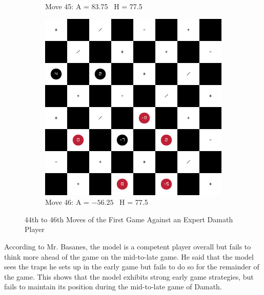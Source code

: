 \begin{figure}[H]
\begin{subfigure}{0.3\textwidth}
        \caption*{Move 45: A = 83.75 \textbar\ H = 77.5}
    \end{subfigure}
    \quad
    \begin{subfigure}{0.3\textwidth}
        \centering
        \includegraphics[width=\textwidth]{images/games/game1/move_47.png}
        \caption*{Move 46: A = $-56.25$ \textbar\ H = 77.5}
    \end{subfigure}
    \caption{44th to 46th Moves of the First Game Against an Expert Damath Player}
    \label{fig:44-46-game1}
\end{figure}

According to Mr. Basanes, the model is a competent player overall but fails to think more ahead of the game on the mid-to-late game. He said that the model sees the traps he sets up in the early game but fails to do so for the remainder of the game. This shows that the model exhibits strong early game strategies, but fails to maintain its position during the mid-to-late game of Damath. 


